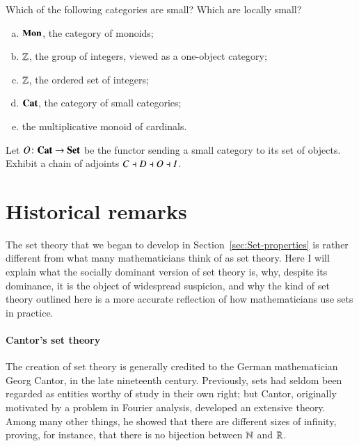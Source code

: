 \begin{question}
Which of the following categories are small?  Which are locally small? 
% 
\begin{enumerate}[(b)]
\item 
$\mathbf{Mon}$, the category of monoids;

\item 
$\mathbb{Z}$, the group of integers, viewed as a one-object category;

\item 
$\mathbb{Z}$, the ordered set of integers;

\item 
$\mathbf{Cat}$, the category of small categories;

\item 
the multiplicative monoid of cardinals.
\end{enumerate}
\end{question}


\begin{question}        
\label{ex:cdoi}
%
%
%
Let $O\from \Cat \to \Set$ be the functor sending a small category to its
set%
%
%
of objects.  Exhibit a chain of adjoints $C \dashv D \dashv O \dashv I$.
\end{question}



\section{Historical remarks}
\label{sec:set-history}


%
%
The set theory that we began to develop in Section~\ref{sec:Set-properties}
is rather different from what many mathematicians think of as set theory.
Here I will explain what the socially dominant version of set theory is,
why, despite its dominance, it is the object of widespread suspicion, and
why the kind of set theory outlined here is a more accurate reflection of
how mathematicians use sets in practice.

\paragraph*{Cantor's set theory} The creation of set theory is generally
credited to the German mathematician Georg Cantor,%
%
%
in the late nineteenth century.  Previously, sets had seldom been regarded
as entities worthy of study in their own right; but Cantor, originally
motivated by a problem in Fourier%
%
%
analysis, developed an extensive theory.  Among many other things, he
showed that there are different sizes of infinity, proving, for instance,
that there is no bijection between $\mathbb{N}$ and $\mathbb{R}$.

